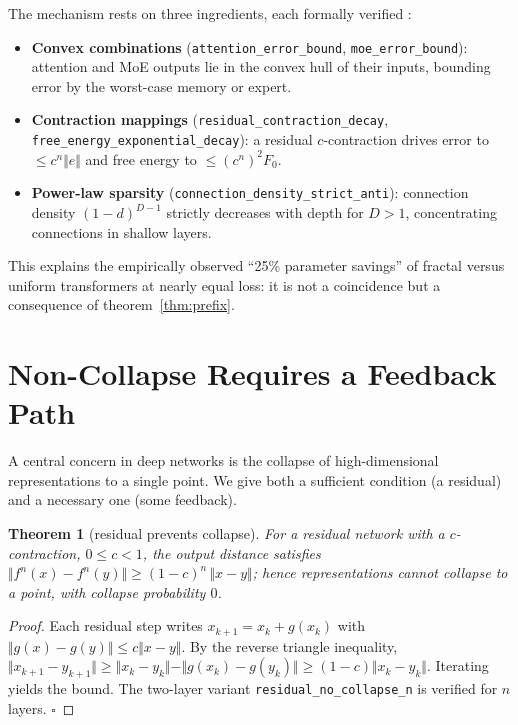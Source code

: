 \documentclass[conference]{IEEEtran}
\newtheorem{theorem}{Theorem}
\begin{document}
The mechanism rests on three ingredients, each formally verified
\cite{fractalnecessity}:
\begin{itemize}
\item \textbf{Convex combinations} (\texttt{attention\_error\_bound},
\texttt{moe\_error\_bound}): attention and MoE outputs lie in the convex hull of
their inputs, bounding error by the worst-case memory or expert.
\item \textbf{Contraction mappings} (\texttt{residual\_contraction\_decay},
\texttt{free\_energy\_exponential\_decay}): a residual $c$-contraction drives
error to $\le c^n\Vert e\Vert$ and free energy to $\le (c^n)^2 F_0$.
\item \textbf{Power-law sparsity} (\texttt{connection\_density\_strict\_anti}):
connection density $(1-d)^{D-1}$ strictly decreases with depth for $D>1$,
concentrating connections in shallow layers.
\end{itemize}

This explains the empirically observed ``25\% parameter savings'' of fractal
versus uniform transformers at nearly equal loss: it is not a coincidence but a
consequence of theorem~\ref{thm:prefix}.

\section{Non-Collapse Requires a Feedback Path}
\label{sec:collapse}
A central concern in deep networks is the collapse of high-dimensional
representations to a single point. We give both a sufficient condition (a
residual) and a necessary one (some feedback).

\begin{theorem}[residual prevents collapse]
\label{thm:residual}
For a residual network with a $c$-contraction, $0\le c<1$, the output distance
satisfies $\Vert f^n(x)-f^n(y)\Vert \ge (1-c)^n\,\Vert x-y\Vert$; hence
representations cannot collapse to a point, with collapse probability $0$.
\end{theorem}

\begin{proof}
Each residual step writes $x_{k+1}=x_k+g(x_k)$ with $\Vert g(x)-g(y)\Vert\le
c\Vert x-y\Vert$. By the reverse triangle inequality,
$\Vert x_{k+1}-y_{k+1}\Vert\ge\Vert x_k-y_k\Vert-\Vert g(x_k)-g(y_k)\Vert\ge
(1-c)\Vert x_k-y_k\Vert$. Iterating yields the bound. The two-layer variant
\texttt{residual\_no\_collapse\_n} is verified for $n$ layers. \hfill$\square$
\end{proof}
\end{document}
